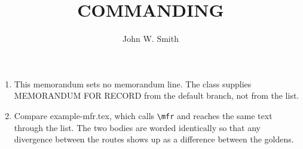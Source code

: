 \documentclass{../armymemo}
\author{John W. Smith}\rank{CPT}\branch{CY}
\title{COMMANDING}
\begin{document}
\begin{enumerate}
	\item This memorandum sets no memorandum line. The class supplies MEMORANDUM FOR
	      RECORD from the default branch, not from the list.
	\item Compare example-mfr.tex, which calls \verb!\mfr! and reaches the same text through
	      the list. The two bodies are worded identically so that any divergence between the
	      routes shows up as a difference between the goldens.
\end{enumerate}
\end{document}
